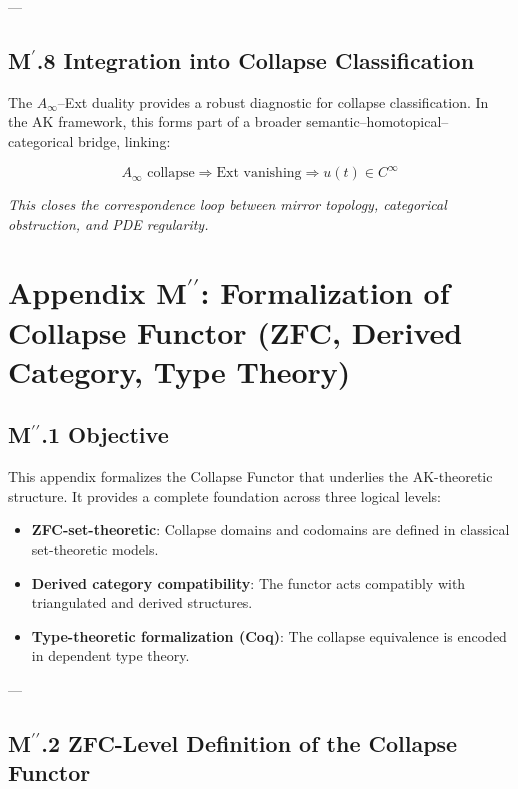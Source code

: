 \documentclass[11pt]{article}
\begin{document}
\begin{axiom}
\begin{axiom}
{{---

\subsection*{M$^\prime$.8 Integration into Collapse Classification}

The $A_\infty$–Ext duality provides a robust diagnostic for collapse classification.  
In the AK framework, this forms part of a broader semantic–homotopical–categorical bridge, linking:

\[
A_\infty \text{ collapse} \Rightarrow \mathrm{Ext} \text{ vanishing} \Rightarrow u(t) \in C^\infty
\]

\textit{This closes the correspondence loop between mirror topology, categorical obstruction, and PDE regularity.}



\section*{Appendix M$^{\prime\prime}$: Formalization of Collapse Functor (ZFC, Derived Category, Type Theory)}

\subsection*{M$^{\prime\prime}$.1 Objective}

This appendix formalizes the Collapse Functor that underlies the AK-theoretic structure.  
It provides a complete foundation across three logical levels:
\begin{itemize}
  \item \textbf{ZFC-set-theoretic}: Collapse domains and codomains are defined in classical set-theoretic models.
  \item \textbf{Derived category compatibility}: The functor acts compatibly with triangulated and derived structures.
  \item \textbf{Type-theoretic formalization (Coq)}: The collapse equivalence is encoded in dependent type theory.
\end{itemize}

---

\subsection*{M$^{\prime\prime}$.2 ZFC-Level Definition of the Collapse Functor}

}}
\end{axiom}
\end{axiom}
\end{document}
